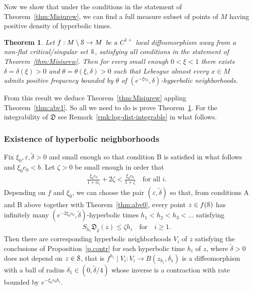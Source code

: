 \documentclass[reqno,12pt,a4paper]{amsart}
\theoremstyle{plain}
\newtheorem{theorem}{Theorem}[section]
\theoremstyle{definition}
\begin{document}
Now we show that under the conditions in the statement of
Theorem~\ref{thm:Misiurew}, we can find a full measure
subset of points of $M$ having positive density of
hyperbolic times.

\begin{theorem}
  \label{thm:dense-hyp-times}
  Let $f:M\setminus{\EuScript{S}} \to M$ be a $C^{1+}$ local
  diffeomorphism away from a non-flat critical/singular set
  ${\EuScript{S}}$, satisfying all conditions in the statement of
  Theorem~\ref{thm:Misiurew}. Then for every small enough
  $0<\xi<1$ there exists $\delta=\delta(\xi)>0$ and
  $\theta=\theta(\xi,\delta)>0$ such that Lebesgue almost
  every $x\in M$ admits positive frequency bounded by
  $\theta$ of $(e^{-\xi c_0},\delta)$-hyperbolic
  neighborhoods.
\end{theorem}

From this result we deduce Theorem~\ref{thm:Misiurew}
appling Theorem~\ref{thm:abv1}. So all we need to do is
prove Theorem~\ref{thm:dense-hyp-times}. For the
integrability of ${{\mathfrak D}}$ see
Remark~\ref{rmk:log-dist-integrable} in what follows.

\subsubsection{Existence of hyperbolic neighborhoods}
\label{sec:existence-hyperb-nei}

Fix $\xi_0,{\varepsilon},\tilde\delta>0$ and small enough so that
condition B is satisfied in what follows and $\xi_0c_0<b$.
Let $\zeta>0$ be small enough in order that
  \begin{align}\label{eq:zeta}
    \frac{\xi_0 c_0}{1+\alpha_i} + 2\zeta
    < \frac{\xi_0 c_0}{1+\zeta} \quad\text{for all   } i.
  \end{align}
  Depending on $f$ and $\xi_0$, we can choose the pair
  $({\varepsilon},\tilde\delta)$ so that, from conditions A and B
  above together with Theorem~\ref{thm:abv0}, every point
  $z\in f({\EuScript{S}})$ has infinitely many $(e^{-2\xi_0
    c_0},\tilde\delta)$-hyperbolic times $h_1<h_2<h_3<\dots$
  satisfying
  \begin{align}\label{eq:Daverage}
    S_{h_i}{{\mathfrak D}}_{\tilde\delta}(z)\le\zeta h_i
    \quad\text{for}\quad i\ge1.
  \end{align}
  Then there are corresponding hyperbolic neighborhoods
  $V_i$ of $z$ satisfying the conclusions of
  Proposition~\ref{p.contr} for each hyperbolic time $h_i$
  of $z$, where $\tilde\delta>0$ does not depend on
  $z\in{\EuScript{S}}$, that is $f^{h_i}\mid V_i: V_i\to
  B(z_{h_i},\delta_1)$ is a diffeomorphism with a ball of
  radius $\delta_1 \in (0,\tilde\delta/4)$ whose inverse is
  a contraction with rate bounded by $e^{-\xi_0 c_0 h_i}$.
\end{document}
